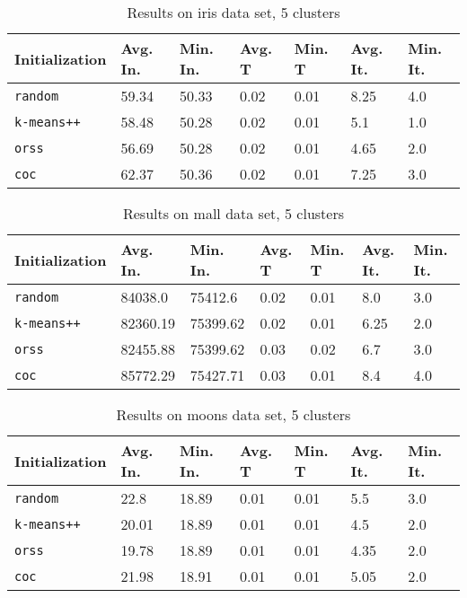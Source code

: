 \begin{table}[p]
	\begin{center}
		\begin{tabular}{|l|l|l|l|l|l|l|}
			\hline
			Initialization & Avg. In. & Min. In. & Avg. T & Min. T & Avg. It. & Min. It.\\\hline
			\texttt{random} & 59.34 & 50.33 & 0.02 & 0.01 & 8.25 & 4.0\\\hline
			\texttt{k-means++} & 58.48 & 50.28 & 0.02 & 0.01 & 5.1 & 1.0\\\hline
			\texttt{orss} & 56.69 & 50.28 & 0.02 & 0.01 & 4.65 & 2.0\\\hline
			\texttt{coc} & 62.37 & 50.36 & 0.02 & 0.01 & 7.25 & 3.0\\\hline
		\end{tabular}
		\caption{Results on iris data set, 5 clusters}
		\label{tbl:iris5}
	\end{center}
\end{table}

\begin{table}[p]
	\begin{center}
		\begin{tabular}{|l|l|l|l|l|l|l|}
			\hline
			Initialization & Avg. In. & Min. In. & Avg. T & Min. T & Avg. It. & Min. It.\\\hline
			\texttt{random} & 84038.0 & 75412.6 & 0.02 & 0.01 & 8.0 & 3.0\\\hline
			\texttt{k-means++} & 82360.19 & 75399.62 & 0.02 & 0.01 & 6.25 & 2.0\\\hline
			\texttt{orss} & 82455.88 & 75399.62 & 0.03 & 0.02 & 6.7 & 3.0\\\hline
			\texttt{coc} & 85772.29 & 75427.71 & 0.03 & 0.01 & 8.4 & 4.0\\\hline
		\end{tabular}
		\caption{Results on mall data set, 5 clusters}
		\label{tbl:mall5}
	\end{center}
\end{table}

\begin{table}[p]
	\begin{center}
		\begin{tabular}{|l|l|l|l|l|l|l|}
			\hline
			Initialization & Avg. In. & Min. In. & Avg. T & Min. T & Avg. It. & Min. It.\\\hline
			\texttt{random} & 22.8 & 18.89 & 0.01 & 0.01 & 5.5 & 3.0\\\hline
			\texttt{k-means++} & 20.01 & 18.89 & 0.01 & 0.01 & 4.5 & 2.0\\\hline
			\texttt{orss} & 19.78 & 18.89 & 0.01 & 0.01 & 4.35 & 2.0\\\hline
			\texttt{coc} & 21.98 & 18.91 & 0.01 & 0.01 & 5.05 & 2.0\\\hline
		\end{tabular}
		\caption{Results on moons data set, 5 clusters}
		\label{tbl:moons5}
	\end{center}
\end{table}

